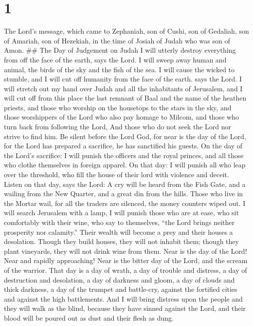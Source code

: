 \hypertarget{section}{%
\section{1}\label{section}}

 The Lord's message, which came to Zephaniah, son of Cushi,
son of Gedaliah, son of Amariah, son of Hezekiah, in the time of Josiah
of Judah who was son of Amon. \#\# The Day of Judgement on Judah
 I will utterly destroy everything from off the face of the
earth, says the Lord.  I will sweep away human and animal,
the birds of the sky and the fish of the sea. I will cause the wicked to
stumble, and I will cut off humanity from the face of the earth. says
the Lord.  I will stretch out my hand over Judah and all the
inhabitants of Jerusalem, and I will cut off from this place the last
remnant of Baal and the name of the heathen priests,  and
those who worship on the housetops to the stars in the sky, and those
worshippers of the Lord who also pay homage to Milcom,  and
those who turn back from following the Lord, And those who do not seek
the Lord nor strive to find him.  Be silent before the Lord
God, for near is the day of the Lord, for the Lord has prepared a
sacrifice, he has sanctified his guests.  On the day of the
Lord's sacrifice: I will punish the officers and the royal princes, and
all those who clothe themselves in foreign apparel.  On that
day: I will punish all who leap over the threshold, who fill the house
of their lord with violence and deceit.  Listen on that
day, says the Lord: A cry will be heard from the Fish Gate, and a
wailing from the New Quarter, and a great din from the hills.
 Those who live in the Mortar wail, for all the traders are
silenced, the money counters wiped out.  I will search
Jerusalem with a lamp, I will punish those who are at ease, who sit
comfortably with their wine, who say to themselves, ``the Lord brings
neither prosperity nor calamity.''  Their wealth will
become a prey and their houses a desolation. Though they build houses,
they will not inhabit them; though they plant vineyards, they will not
drink wine from them.  Near is the day of the Lord! Near
and rapidly approaching! Near is the bitter day of the Lord, and the
scream of the warrior.  That day is a day of wrath, a day
of trouble and distress, a day of destruction and desolation, a day of
darkness and gloom, a day of clouds and thick darkness,  a
day of the trumpet and battle-cry, against the fortified cities and
against the high battlements.  And I will bring distress
upon the people and they will walk as the blind, because they have
sinned against the Lord, and their blood will be poured out as dust and
their flesh as dung.

